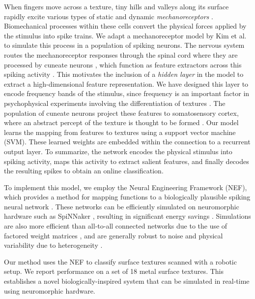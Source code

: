When fingers move across a texture, tiny hills and valleys along its surface rapidly excite various types of static and dynamic {\it mechanoreceptors} \citep{weber2013spatial}. Biomechanical processes within these cells convert the physical forces applied by the stimulus into spike trains. We adapt a mechanoreceptor model by Kim et al. \citep{kim2011does} to simulate this process in a population of spiking neurons.  The nervous system routes the mechanoreceptor responses  through the spinal cord where they are  processed by cuneate neurons \citep{saal2014touch}, which function as feature extractors across this spiking activity   \citep{jorntell2014segregation}. This motivates the inclusion of a {\it hidden layer} in the model  to extract a high-dimensional feature representation. We have designed  this layer to encode frequency bands of the stimulus, since frequency is an important factor in psychophysical experiments involving the differentiation of textures \citep{unger2013physical}. 
The population of cuneate neurons project these features to somatosensory cortex, where an abstract percept of the texture is thought to be formed  \citep{jorntell2014segregation}. Our model  learns the mapping from features to textures using a support vector machine (SVM). These learned weights are embedded  within the connection to a recurrent output layer. To summarize, the network encodes the physical stimulus into spiking activity, maps this activity to extract salient features, and finally decodes the resulting spikes to obtain an online classification. 

To implement this model, we employ  the Neural Engineering Framework (NEF), which  provides a method for mapping functions to a biologically plausible spiking neural network \citep{eliasmith2003a}. %
These networks can be efficiently simulated on neuromorphic hardware such as SpiNNaker \citep{mundy2015}, resulting in significant energy savings \citep{hasler2013finding}. Simulations are also more efficient than all-to-all connected networks due to the use of factored weight matrices \citep{bekolay2013},  and are generally robust to noise and physical variability due to heterogeneity \citep{hunsberger2014}.

Our method uses the NEF to classify surface textures scanned with a robotic setup. We report performance on a set of 18 metal surface textures. This establishes a novel biologically-inspired system that can be simulated in real-time using neuromorphic hardware.

